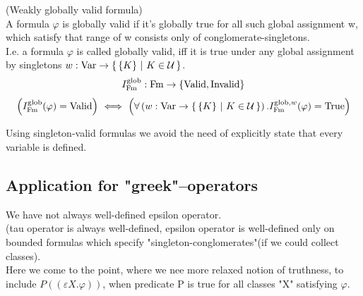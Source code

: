 \begin{definition}(Weakly globally valid formula)\\
A formula $\varphi$ is globally valid if it's globally true for all such global assignment w, which satisfy that range of w consists only of conglomerate-singletons.\\
I.e. a formula $\varphi$ is called globally valid, iff it is true under any global assignment by singletons $w:\mathrm{Var}\to\left\{\,\{K\}\ \middle|\ K\in\mathcal{U}\,\right\}$.
\[
I^{\mathrm{glob}}_{\mathrm{Fm}} : \mathrm{Fm} \to \{\mathrm{Valid},\mathrm{Invalid}\}
\]
\[
\left(I^{\mathrm{glob}}_{\mathrm{Fm}}(\varphi)=\mathrm{Valid}\right) \ \Longleftrightarrow\ 
 \left(\forall \left(w:\mathrm{Var}\to\left\{\,\{K\}\ \middle|\ K\in\mathcal{U}\,\right\}\right).I^{\mathrm{glob},w}_{\mathrm{Fm}}(\varphi)=\mathrm{True}\right)
\]
\end{definition}
Using singleton-valid formulas we avoid the need of explicitly state that every variable is defined.

\subsection{Application for "greek"--operators}

We have not always well-defined epsilon operator.\\
(tau operator is always well-defined, epsilon operator is well-defined only on bounded formulas which specify "singleton-conglomerates"(if we could collect classes).\\

Here we come to the point, where we nee more relaxed notion of truthness, to include $P((\varepsilon X. \varphi))$, when predicate P is true for all classes "X" satisfying $\varphi$.

